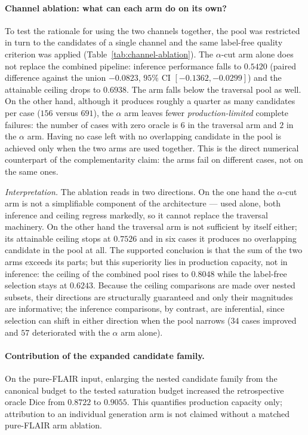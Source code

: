 \documentclass[11pt,a4paper]{article}
\begin{document}
\paragraph{Channel ablation: what can each arm do on its own?} To test the
rationale for using the two channels together, the pool was restricted in turn to
the candidates of a single channel and the same label-free quality criterion was
applied (Table~\ref{tab:channel-ablation}). The $\alpha$-cut arm alone does not
replace the combined pipeline: inference performance falls to $0.5420$ (paired
difference against the union $-0.0823$, $95\%$ CI $[-0.1362,-0.0299]$) and the
attainable ceiling drops to $0.6938$. The arm falls below the traversal pool as
well. On the other hand, although it produces roughly a quarter as many candidates
per case ($156$ versus $691$), the $\alpha$ arm leaves fewer
\emph{production-limited} complete failures: the number of cases with zero oracle
is $6$ in the traversal arm and $2$ in the $\alpha$ arm. Having no case left with
no overlapping candidate in the pool is achieved only when the two arms are used
together. This is the direct numerical counterpart of the complementarity claim:
the arms fail on different cases, not on the same ones.

\emph{Interpretation.} The ablation reads in two directions. On the one hand the
$\alpha$-cut arm is not a simplifiable component of the architecture --- used
alone, both inference and ceiling regress markedly, so it cannot replace the
traversal machinery. On the other hand the traversal arm is not sufficient by
itself either; its attainable ceiling stops at $0.7526$ and in six cases it
produces no overlapping candidate in the pool at all. The supported conclusion is
that the sum of the two arms exceeds its parts; but this superiority lies in
production capacity, not in inference: the ceiling of the combined pool rises to
$0.8048$ while the label-free selection stays at $0.6243$. Because the ceiling
comparisons are made over nested subsets, their directions are structurally
guaranteed and only their magnitudes are informative; the inference comparisons,
by contrast, are inferential, since selection can shift in either direction when
the pool narrows ($34$ cases improved and $57$ deteriorated with the $\alpha$ arm
alone).
\fi

\paragraph{Contribution of the expanded candidate family.} On the pure-FLAIR
input, enlarging the nested candidate family from the canonical budget to the
tested saturation budget increased the retrospective oracle Dice from $0.8722$
to $0.9055$. This quantifies production capacity only; attribution to an
individual generation arm is not claimed without a matched pure-FLAIR arm
ablation.
\end{document}

